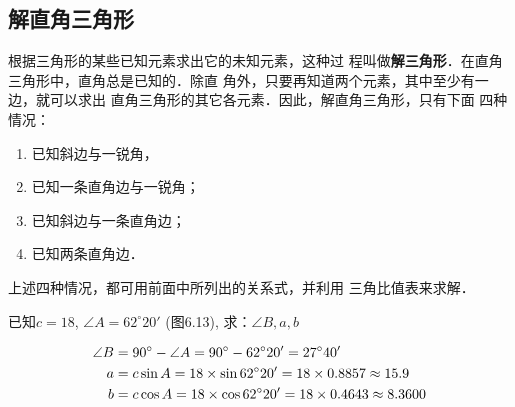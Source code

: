 \subsection{解直角三角形}
根据三角形的某些已知元素求出它的未知元素，这种过
程叫做\textbf{解三角形}．在直角三角形中，直角总是已知的．除直
角外，只要再知道两个元素，其中至少有一边，就可以求出
直角三角形的其它各元素．因此，解直角三角形，只有下面
四种情况：
\begin{enumerate}
    \item 已知斜边与一锐角，
    \item 已知一条直角边与一锐角；
    \item 已知斜边与一条直角边；
    \item 已知两条直角边．
\end{enumerate}

上述四种情况，都可用前面中所列出的关系式，并利用
三角比值表来求解．

\begin{example}
    已知$c=18$, $\angle A=62^{\circ}20'$ (图6.13),
求：$\angle B, a, b$
\end{example}

\begin{solution}
\[\begin{split}
    \angle B&=90^{\circ}-\angle A=90^{\circ}-62^{\circ}20'
=27^{\circ}40'\\
a&=c\sin A=18\times \sin62^{\circ}20'=18\times0.8857
\approx 15.9\\
b&=c\cos A=18\times\cos62^{\circ}20'=18\times0.4643\approx 8.3600
\end{split}\]
\end{solution}

\begin{figure}[htp]\centering
    \begin{minipage}[t]{0.48\textwidth}
    \centering
{}
    \caption{}
    \end{minipage}
    \begin{minipage}[t]{0.48\textwidth}
    \centering
    \caption{}
    \end{minipage}
    \end{figure}

